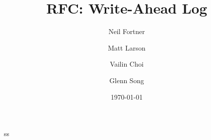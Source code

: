 \documentclass[letterpaper,hyper]{HDF5_RFC}
\title{RFC: Write-Ahead Log}
\author{Neil Fortner}
\author{Matt Larson}
\author{Vailin Choi}
\author{Glenn Song}
\date{\today}
\begin{document}
\maketitle



\makerevisions

\tableofcontents


\newpage


\newpage


\newpage


\newpage



 
\appendix
%
%
%

ss
\end{document}
